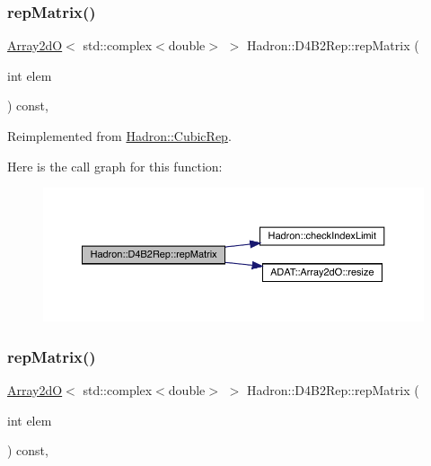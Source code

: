 \subsubsection{\texorpdfstring{repMatrix()}{repMatrix()}\hspace{0.1cm}{\footnotesize\ttfamily [1/2]}}
{\footnotesize\ttfamily \mbox{\hyperlink{classADAT_1_1Array2dO}{Array2dO}}$<$ std\+::complex$<$double$>$ $>$ Hadron\+::\+D4\+B2\+Rep\+::rep\+Matrix (\begin{DoxyParamCaption}\item[{int}]{elem }\end{DoxyParamCaption}) const\hspace{0.3cm}{\ttfamily [inline]}, {\ttfamily [virtual]}}



Reimplemented from \mbox{\hyperlink{structHadron_1_1CubicRep_ac5d7e9e6f4ab1158b5fce3e4ad9e8005}{Hadron\+::\+Cubic\+Rep}}.

Here is the call graph for this function\+:
\nopagebreak
\begin{figure}[H]
\begin{center}
\leavevmode
\includegraphics[width=350pt]{d0/d07/structHadron_1_1D4B2Rep_a245244df26be686b405786bd1df4627e_cgraph}
\end{center}
\end{figure}
\mbox{\label{structHadron_1_1D4B2Rep_a245244df26be686b405786bd1df4627e}} 
\subsubsection{\texorpdfstring{repMatrix()}{repMatrix()}\hspace{0.1cm}{\footnotesize\ttfamily [2/2]}}
{\footnotesize\ttfamily \mbox{\hyperlink{classADAT_1_1Array2dO}{Array2dO}}$<$ std\+::complex$<$double$>$ $>$ Hadron\+::\+D4\+B2\+Rep\+::rep\+Matrix (\begin{DoxyParamCaption}\item[{int}]{elem }\end{DoxyParamCaption}) const\hspace{0.3cm}{\ttfamily [inline]}, {\ttfamily [virtual]}}



